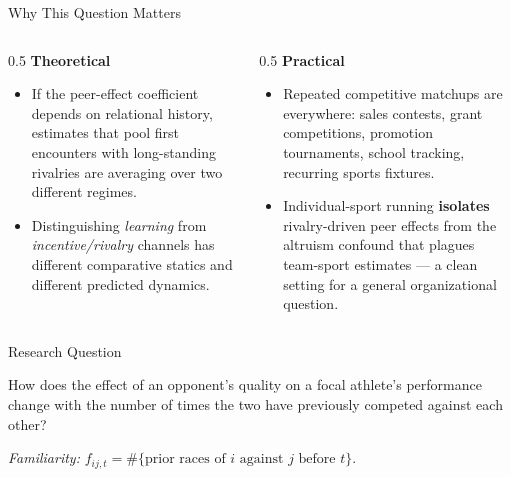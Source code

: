 \documentclass[11pt,aspectratio=169]{beamer}
\begin{document}
\begin{frame}{Why This Question Matters}
\begin{columns}[T]
\begin{column}{0.5\textwidth}
\textbf{Theoretical}
\begin{itemize}
    \item If the peer-effect coefficient depends on relational history,
          estimates that pool first encounters with long-standing rivalries
          are averaging over two different regimes.
    \item Distinguishing \emph{learning} from \emph{incentive/rivalry}
          channels has different comparative statics and different
          predicted dynamics.
\end{itemize}
\end{column}
\begin{column}{0.5\textwidth}
\textbf{Practical}
\begin{itemize}
    \item Repeated competitive matchups are everywhere: sales contests,
          grant competitions, promotion tournaments, school tracking,
          recurring sports fixtures.
    \item Individual-sport running \textbf{isolates} rivalry-driven peer
          effects from the altruism confound that plagues team-sport
          estimates --- a clean setting for a general organizational
          question.
\end{itemize}
\end{column}
\end{columns}
\end{frame}

\begin{frame}{Research Question}
\begin{block}{}
\centering
\Large How does the effect of an opponent's quality on a focal athlete's
performance change with the number of times the two have previously
competed against each other?
\end{block}
\vspace{1em}
\textit{Familiarity:} $f_{ij,t} = \#\{\text{prior races of } i \text{ against } j
\text{ before } t\}$.
\end{frame}
\end{document}
